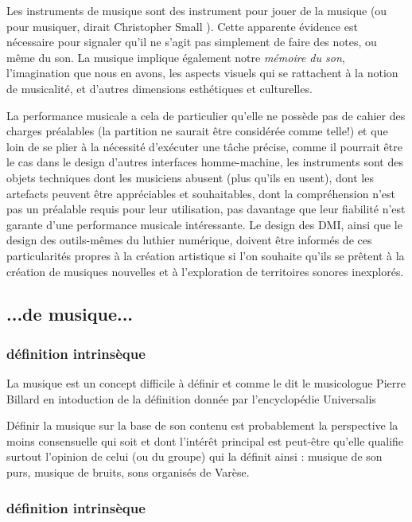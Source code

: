 Les instruments de musique sont des instrument pour jouer de la musique (ou pour musiquer, dirait Christopher Small \cite{small_musicking:_1998}). Cette apparente évidence est nécessaire pour signaler qu'il ne s'agit pas simplement de faire des notes, ou même du son. La musique implique également notre \textit{mémoire du son}, l'imagination que nous en avons, les aspects visuels qui se rattachent à la notion de musicalité, et d'autres dimensions esthétiques et culturelles. 

La performance musicale a cela de particulier qu'elle ne possède pas de cahier des charges préalables (la partition ne saurait être considérée comme telle!) et que loin de se plier à la nécessité d'exécuter une tâche précise, comme il pourrait être le cas dans le design d'autres interfaces homme-machine, les instruments sont des objets techniques dont les musiciens abusent (plus qu'ils en usent), dont les artefacts peuvent être appréciables et souhaitables, dont la compréhension n'est pas un préalable requis pour leur utilisation, pas davantage que leur fiabilité n'est garante d'une performance musicale intéressante.
%
Le design des DMI, ainsi que le design des outils-mêmes du luthier numérique, doivent être informés de ces particularités propres à la création artistique si l'on souhaite qu'ils se prêtent à la création de musiques nouvelles et à l'exploration de territoires sonores inexplorés.


\subsection*{...de musique...} 
\subsubsection*{définition intrinsèque}
La musique est un concept difficile à définir et comme le dit le musicologue Pierre Billard en intoduction de la définition donnée par l'encyclopédie Universalis 

Définir la musique sur la base de son contenu est probablement la perspective la moins consensuelle qui soit et dont l'intérêt principal est peut-être qu'elle qualifie surtout l'opinion de celui (ou du groupe) qui la définit ainsi : musique de son purs, musique de bruits, sons organisés de Varèse.
\subsubsection*{définition intrinsèque}

